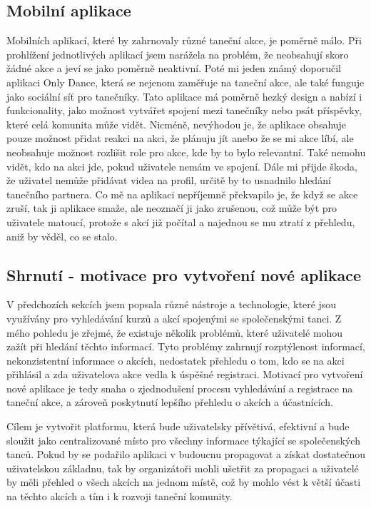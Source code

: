 \subsection{Mobilní aplikace}
Mobilních aplikací, které by zahrnovaly různé taneční akce, je poměrně málo. Při prohlížení jednotlivých aplikací jsem narážela na problém, že neobsahují skoro žádné akce a jeví se jako poměrně neaktivní. Poté mi jeden známý doporučil aplikaci Only Dance, která se nejenom zaměřuje na taneční akce, ale také funguje jako sociální síť pro tanečníky. Tato aplikace má poměrně hezký design a nabízí i funkcionality, jako možnost vytvářet spojení mezi tanečníky nebo psát příspěvky, které celá komunita může vidět. Nicméně, nevýhodou je, že aplikace obsahuje pouze možnost přidat reakci na akci, že plánuju jít anebo že se mi akce líbí, ale neobsahuje možnost rozlišit role pro akce, kde by to bylo relevantní. Také nemohu vidět, kdo na akci jde, pokud uživatele nemám ve spojení. Dále mi přijde škoda, že uživatel nemůže přidávat videa na profil, určitě by to usnadnilo hledání tanečního partnera. Co mě na aplikaci nepříjemně překvapilo je, že když se akce zruší, tak ji aplikace smaže, ale neoznačí ji jako zrušenou, což může být pro uživatele matoucí, protože s akcí již počítal a najednou se mu ztratí z přehledu, aniž by věděl, co se stalo.

\subsection{Shrnutí - motivace pro vytvoření nové aplikace}
V předchozích sekcích jsem popsala různé nástroje a technologie, které jsou využívány pro vyhledávání kurzů a akcí spojenými se společenskými tanci. Z mého pohledu je zřejmé, že existuje několik problémů, které uživatelé mohou zažít při hledání těchto informací. Tyto problémy zahrnují rozptýlenost informací, nekonzistentní informace o akcích, nedostatek přehledu o tom, kdo se na akci přihlásil a zda uživatelova akce vedla k úspěšné registraci. Motivací pro vytvoření nové aplikace je tedy snaha o zjednodušení procesu vyhledávání a registrace na taneční akce, a zároveň poskytnutí lepšího přehledu o akcích a účastnících. 

Cílem je vytvořit platformu, která bude uživatelsky přívětivá, efektivní a bude sloužit jako centralizované místo pro všechny informace týkající se společenských tanců. Pokud by se podařilo aplikaci v budoucnu propagovat a získat dostatečnou uživatelskou základnu, tak by organizátoři mohli ušetřit za propagaci a uživatelé by měli přehled o všech akcích na jednom místě, což by mohlo vést k větší účasti na těchto akcích a tím i k rozvoji taneční komunity.